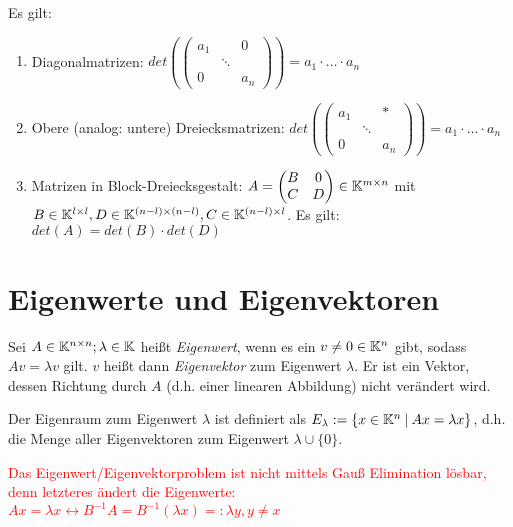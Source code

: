 \begin{satz} Es gilt:
	\begin{enumerate}[noitemsep]
		\item Diagonalmatrizen: $det( \left( \begin{smallmatrix}
		a_1 & & 0 \\
		& \ddots & \\
		0 & & a_n 
		\end{smallmatrix} \right) ) = a_1 \cdot \dots \cdot a_n$
		\item Obere (analog: untere) Dreiecksmatrizen: $det( \left( \begin{smallmatrix}
		a_1 & & * \\
		& \ddots & \\
		0 & & a_n 
		\end{smallmatrix}  \right) ) = a_1 \cdot \dots \cdot a_n$
		\item Matrizen in Block-Dreiecksgestalt: $A = \begin{pmatrix}
		B & 0 \\
		C & D 
		\end{pmatrix} \in \mathbb{K}^{m \times n}$ mit $B \in \mathbb{K}^{l \times l}, D \in \mathbb{K}^{(n-l) \times (n-l)}, C \in \mathbb{K}^{(n-l) \times l}$.
		Es gilt: $det(A) = det(B) \cdot det(D)$
	\end{enumerate}
\end{satz}


\section{Eigenwerte und Eigenvektoren}
\begin{definition}	
	Sei $A \in \mathbb{K}^{n \times n}; \lambda \in \mathbb{K} $ heißt \emph{Eigenwert}, wenn es ein $v \neq 0 \in \mathbb{K}^n$ gibt, sodass $Av = \lambda v$ gilt. $v$ heißt dann \emph{Eigenvektor} zum Eigenwert $\lambda$. Er ist ein Vektor, dessen Richtung durch $A$ (d.h. einer linearen Abbildung) nicht verändert wird.

	Der Eigenraum zum Eigenwert $\lambda$ ist definiert als $E_\lambda := \{x \in \mathbb{K}^n \medspace | \medspace Ax = \lambda x \}$, d.h. die Menge aller Eigenvektoren zum Eigenwert $\lambda \cup \{0\}$. 
	
	\textcolor{red}{Das Eigenwert/Eigenvektorproblem ist nicht mittels Gauß Elimination lösbar, denn letzteres ändert die Eigenwerte: $Ax = \lambda x \leftrightarrow B^{-1}A = B^{-1}(\lambda x) =: \lambda y, y \neq x$}
\end{definition}

